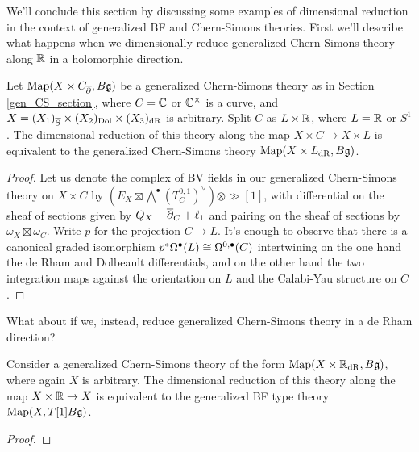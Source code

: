 \documentclass[10pt, oneside]{article}
\begin{document}
We'll conclude this section by discussing some examples of dimensional reduction in the context of generalized BF and Chern-Simons theories.  First we'll describe what happens when we dimensionally reduce generalized Chern-Simons theory along $\mathbb R$ in a holomorphic direction.

\begin{lemma} \label{CS_diml_red_lemma}
Let $\operatorname{Map}(X \times C_{\overline{\partial}}, B\mathfrak{g})$ be a generalized Chern-Simons theory as in Section \ref{gen_CS_section}, where $C = \mathbb C$ or $\mathbb C^\times$ is a curve, and $X = (X_1)_{\overline{\partial}} \times (X_2)_{\mathrm{Dol}} \times (X_3)_{\mathrm{dR}}$ is arbitrary.  Split $C$ as $L \times \mathbb R$, where $L = \mathbb R$ or $S^1$.  The  dimensional reduction of this theory along the map $X \times C \to X \times L$ is equivalent to the generalized Chern-Simons theory $\operatorname{Map}(X \times L_{\mathrm{dR}}, B\mathfrak{g})$.
\end{lemma}


\begin{proof}
Let us denote the complex of BV fields in our generalized Chern-Simons theory on $X \times C$ by $(E_X \boxtimes \bigwedge^\bullet (T^{0,1}_C)^\vee) \otimes \gg[1]$, with differential on the sheaf of sections given by $Q_X + \overline{\partial}_C + \ell_1$ and pairing on the sheaf of sections by $\omega_X \boxtimes \omega_C$. Write $p$ for the projection $C \to L$.  It's enough to observe that there is a canonical graded isomorphism $p^*\Omega^\bullet(L) \cong \Omega^{0,\bullet}(C)$ intertwining on the one hand the de Rham and Dolbeault differentials, and on the other hand the two integration maps against the orientation on $L$ and the Calabi-Yau structure on $C$.
\end{proof}

What about if we, instead, reduce generalized Chern-Simons theory in a de Rham direction?

\begin{lemma} \label{CS_to_BF_diml_red_lemma}
Consider a generalized Chern-Simons theory of the form $\operatorname{Map}(X \times \mathbb R_{\mathrm{dR}}, B\mathfrak{g})$, where again $X$ is arbitrary.  The dimensional reduction of this theory along the map $X \times \mathbb R \to X$ is equivalent to the generalized BF type theory $\operatorname{Map}(X, T[1]B\mathfrak{g})$.
\end{lemma}

\begin{proof}
\end{proof}
\end{document}
